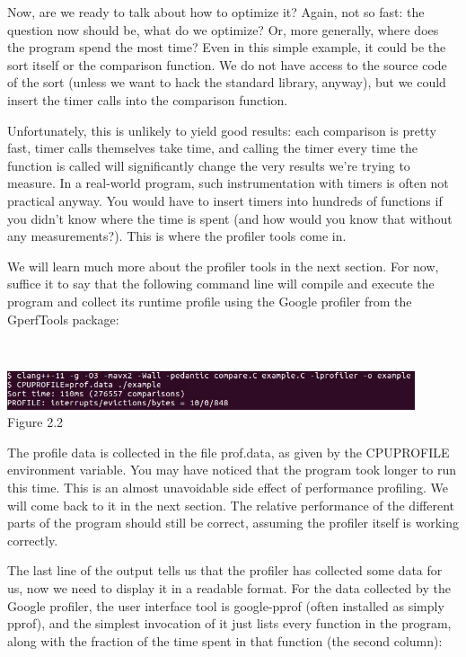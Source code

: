 Now, are we ready to talk about how to optimize it? Again, not so fast: the question now should be, what do we optimize? Or, more generally, where does the program spend the most time? Even in this simple example, it could be the sort itself or the comparison function. We do not have access to the source code of the sort (unless we want to hack the standard library, anyway), but we could insert the timer calls into the comparison function.

Unfortunately, this is unlikely to yield good results: each comparison is pretty fast, timer calls themselves take time, and calling the timer every time the function is called will significantly change the very results we're trying to measure. In a real-world program, such instrumentation with timers is often not practical anyway. You would have to insert timers into hundreds of functions if you didn't know where the time is spent (and how would you know that without any measurements?). This is where the profiler tools come in.

We will learn much more about the profiler tools in the next section. For now, suffice it to say that the following command line will compile and execute the program and collect its runtime profile using the Google profiler from the GperfTools package:

\hspace*{\fill} \\ %
\begin{center}
\includegraphics[width=0.9\textwidth]{content/1/chapter2/images/2.jpg}\\
Figure 2.2
\end{center}

The profile data is collected in the file prof.data, as given by the CPUPROFILE environment variable. You may have noticed that the program took longer to run this time. This is an almost unavoidable side effect of performance profiling. We will come back to it in the next section. The relative performance of the different parts of the program should still be correct, assuming the profiler itself is working correctly.

The last line of the output tells us that the profiler has collected some data for us, now we need to display it in a readable format. For the data collected by the Google profiler, the user interface tool is google-pprof (often installed as simply pprof), and the simplest invocation of it just lists every function in the program, along with the fraction of the time spent in that function (the second column):

